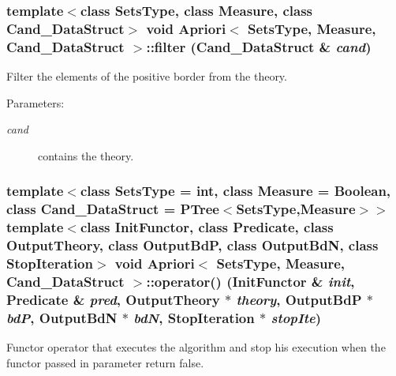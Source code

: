 \subsubsection{\setlength{\rightskip}{0pt plus 5cm}template$<$class Sets\-Type, class Measure, class Cand\_\-Data\-Struct$>$ void {\bf Apriori}$<$ Sets\-Type, Measure, Cand\_\-Data\-Struct $>$::filter (Cand\_\-Data\-Struct \& {\em cand})\hspace{0.3cm}{\tt  [protected]}}\label{class_apriori_44e415598f2de8a80b341c53dce01b12}


Filter the elements of the positive border from the theory. 

\begin{Desc}
\item[Parameters:]
\begin{description}
\item[{\em cand}]contains the theory. \end{description}
\end{Desc}
\subsubsection{\setlength{\rightskip}{0pt plus 5cm}template$<$class Sets\-Type = int, class Measure = Boolean, class Cand\_\-Data\-Struct = PTree$<$Sets\-Type,Measure$>$$>$ template$<$class Init\-Functor, class Predicate, class Output\-Theory, class Output\-Bd\-P, class Output\-Bd\-N, class Stop\-Iteration$>$ void {\bf Apriori}$<$ Sets\-Type, Measure, Cand\_\-Data\-Struct $>$::operator() (Init\-Functor \& {\em init}, {\bf Predicate} \& {\em pred}, Output\-Theory $\ast$ {\em theory}, Output\-Bd\-P $\ast$ {\em bd\-P}, Output\-Bd\-N $\ast$ {\em bd\-N}, Stop\-Iteration $\ast$ {\em stop\-Ite})\hspace{0.3cm}{\tt  [inline]}}\label{class_apriori_117edc08779546395973171927fb8a77}


Functor operator that executes the algorithm and stop his execution when the functor passed in parameter return false. 

